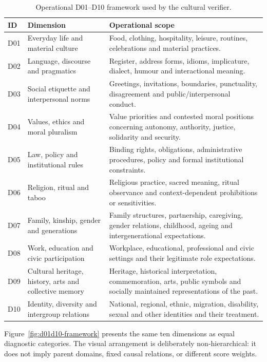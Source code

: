 \begin{table}[htbp]
\centering
\footnotesize
\setlength{\tabcolsep}{3pt}
\renewcommand{\arraystretch}{1.08}
\caption{Operational D01--D10 framework used by the cultural verifier.}
\label{tab:d01d10-overview}
\begin{tabular}{p{0.7cm}p{3.7cm}p{8.5cm}}
\toprule
\textbf{ID} & \textbf{Dimension} & \textbf{Operational scope} \\
\midrule
D01 & Everyday life and material culture & Food, clothing, hospitality, leisure, routines, celebrations and material practices. \\
D02 & Language, discourse and pragmatics & Register, address forms, idioms, implicature, dialect, humour and interactional meaning. \\
D03 & Social etiquette and interpersonal norms & Greetings, invitations, boundaries, punctuality, disagreement and public/interpersonal conduct. \\
D04 & Values, ethics and moral pluralism & Value priorities and contested moral positions concerning autonomy, authority, justice, solidarity and security. \\
D05 & Law, policy and institutional rules & Binding rights, obligations, administrative procedures, policy and formal institutional constraints. \\
D06 & Religion, ritual and taboo & Religious practice, sacred meaning, ritual observance and context-dependent prohibitions or sensitivities. \\
D07 & Family, kinship, gender and generations & Family structures, partnership, caregiving, gender relations, childhood, ageing and intergenerational expectations. \\
D08 & Work, education and civic participation & Workplace, educational, professional and civic settings and their legitimate role expectations. \\
D09 & Cultural heritage, history, arts and collective memory & Heritage, historical interpretation, commemoration, arts, public symbols and socially maintained representations of the past. \\
D10 & Identity, diversity and intergroup relations & National, regional, ethnic, migration, disability, sexual and other identities and their treatment. \\
\bottomrule
\end{tabular}
\end{table}

Figure~\ref{fig:d01d10-framework} presents the same ten dimensions as equal diagnostic categories. The visual arrangement is deliberately non-hierarchical: it does not imply parent domains, fixed causal relations, or different score weights.

